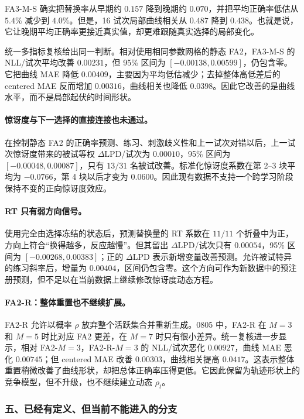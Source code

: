 FA3-M-S 确实把替换率从早期约 $0.157$ 降到晚期约 $0.070$，并把平均正确率低估从 $5.4\%$ 减少到 $4.0\%$。但是，16 试次局部曲线相关从 $0.487$ 降到 $0.438$。也就是说，它让晚期平均正确率更接近真实值，却更难跟随真实选择的局部变化。

统一多指标复核给出同一判断。相对使用相同参数网格的静态 FA2，FA3-M-S 的 NLL/试次平均改善 $0.00231$，但 95\% 区间为 $[-0.00138,0.00599]$，仍包含零。它把曲线 MAE 降低 $0.00409$，主要因为平均低估减少；去掉整体高低差后的 centered MAE 反而增加 $0.00316$，曲线相关也降低 $0.0398$。因此它改善的是曲线水平，而不是局部起伏的时间形状。

\paragraph{惊讶度与下一选择的直接连接也未通过。}
在控制静态 FA2 的正确率预测、练习、刺激歧义性和上一试次对错以后，上一试次惊讶度带来的被试等权 $\Delta\mathrm{LPD}$/试次为 $0.00010$，95\% 区间为 $[-0.00048,0.00087]$，只有 $13/31$ 名被试改善。标准化惊讶度系数在第 2--3 块平均为 $-0.0766$，第 4 块以后才变为 $0.0600$。因此现有数据不支持一个跨学习阶段保持不变的正向惊讶度效应。

\paragraph{RT 只有弱方向信号。}
使用完全由选择冻结的状态后，预测替换量的 RT 系数在 $11/11$ 个折叠中为正，方向上符合“换得越多，反应越慢”。但其留出 $\Delta\mathrm{LPD}$/试次只有 $0.00054$，95\% 区间为 $[-0.00268,0.00383]$；正的 $\Delta\mathrm{LPD}$ 表示新增变量改善预测。允许被试特异的练习斜率后，增量为 $0.00404$，区间仍包含零。这个方向可作为新数据中的预注册预测，但不足以在当前数据上继续修改惊讶度动态方程。

\paragraph{FA2-R：整体重置也不继续扩展。}
FA2-R 允许以概率 $\rho$ 放弃整个活跃集合并重新生成。0805 中，FA2-R 在 $M=3$ 和 $M=5$ 时比对应 FA2 更差，在 $M=7$ 时只有很小差异。统一复核进一步显示，相对 FA2-$M=3$，FA2-R-$M=3$ 的 NLL/试次恶化 $0.00927$，曲线 MAE 恶化 $0.00745$；但 centered MAE 改善 $0.00303$，曲线相关提高 $0.0417$。这表示整体重置稍微改善了曲线形状，却把总体正确率压得更低。它因此保留为轨迹形状上的竞争模型，但不升级，也不继续建立动态 $\rho_t$。


\subsubsection{五、已经有定义、但当前不能进入的分支}

